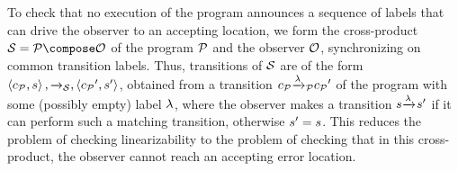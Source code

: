 To check that no execution of the program announces a sequence of labels that
can drive the observer to an accepting location, we form
the cross-product $\system=\prog\compose\observer$ of the program ${\mathcal P}$
and the observer ${\mathcal O}$, synchronizing on common transition labels.
Thus, transitions of ${\mathcal S}$ are of the form
$\left\langle c_{{\mathcal P}},s\right\rangle,{\xrightarrow{}{}}_{\!\!{\mathcal S}},\left\langle{c_{{\mathcal P}}}',s'\right\rangle$,
obtained from a transition
$c_{{\mathcal P}} {\xrightarrow{\lambda}{}}_{\!\!{\mathcal P}} {c_{{\mathcal P}}}'$ of the program with some (possibly empty)
label $\lambda$, where the observer makes a transition
$s {\xrightarrow{\lambda}{}}_{\!\!} {s}'$ if it can perform such a matching
transition, otherwise $s' = s$.
This reduces the
problem of checking linearizability to the problem of checking that
in this cross-product, the observer cannot reach an accepting error location.

%




